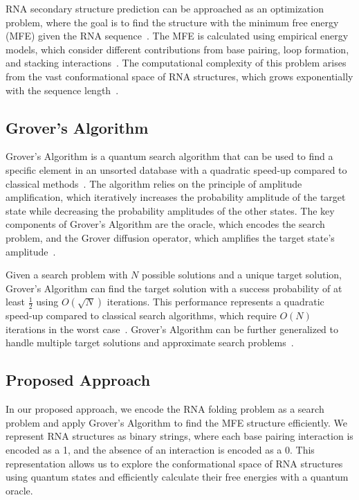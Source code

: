RNA secondary structure prediction can be approached as an optimization problem, where the goal is to find the structure with the minimum free energy (MFE) given the RNA sequence~\cite{zuker1981optimal}. The MFE is calculated using empirical energy models, which consider different contributions from base pairing, loop formation, and stacking interactions~\cite{turner2009rna}. The computational complexity of this problem arises from the vast conformational space of RNA structures, which grows exponentially with the sequence length~\cite{schlick2010innovations}.

\subsection{Grover's Algorithm}

Grover's Algorithm is a quantum search algorithm that can be used to find a specific element in an unsorted database with a quadratic speed-up compared to classical methods~\cite{grover1996fast}. The algorithm relies on the principle of amplitude amplification, which iteratively increases the probability amplitude of the target state while decreasing the probability amplitudes of the other states. The key components of Grover's Algorithm are the oracle, which encodes the search problem, and the Grover diffusion operator, which amplifies the target state's amplitude~\cite{nielsen2010quantum}.

Given a search problem with $N$ possible solutions and a unique target solution, Grover's Algorithm can find the target solution with a success probability of at least $\frac{1}{2}$ using $O(\sqrt{N})$ iterations. This performance represents a quadratic speed-up compared to classical search algorithms, which require $O(N)$ iterations in the worst case~\cite{grover1996fast}. Grover's Algorithm can be further generalized to handle multiple target solutions and approximate search problems~\cite{boyer1998tight, brassard2002quantum}.

\subsection{Proposed Approach}

In our proposed approach, we encode the RNA folding problem as a search problem and apply Grover's Algorithm to find the MFE structure efficiently. We represent RNA structures as binary strings, where each base pairing interaction is encoded as a 1, and the absence of an interaction is encoded as a 0. This representation allows us to explore the conformational space of RNA structures using quantum states and efficiently calculate their free energies with a quantum oracle.

